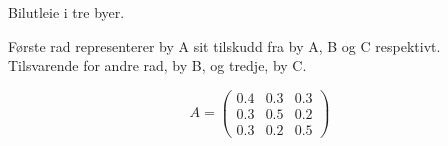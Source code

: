 Bilutleie i tre byer.

Første rad representerer by A sit tilskudd fra by A, B og C respektivt.
Tilsvarende for andre rad, by B, og tredje, by C.

$$A = \begin{pmatrix}
      0.4 & 0.3 & 0.3 \\
      0.3 & 0.5 & 0.2 \\
      0.3 & 0.2 & 0.5
      \end{pmatrix}$$
